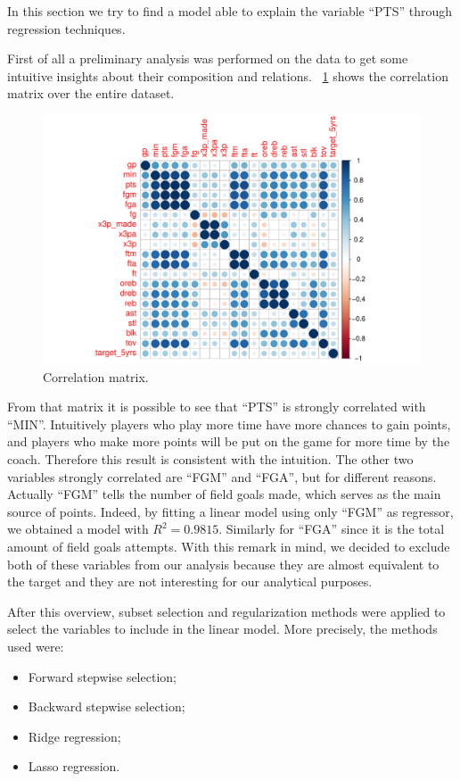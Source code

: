 In this section we try to find a model able to explain the variable ``PTS'' through regression techniques.

First of all a preliminary analysis was performed on the data to get some intuitive insights about their composition and relations.
\Fig~\ref{fig:CorrMatrix} shows the correlation matrix over the entire dataset.
\begin{figure}[H]
	\centering
	\includegraphics[width=0.7\linewidth]{ImageFiles/Regression/CorrMatrix.pdf}
	\caption{Correlation matrix.}
	\label{fig:CorrMatrix}
\end{figure}

From that matrix it is possible to see that ``PTS'' is strongly correlated with ``MIN''. Intuitively players who play more time have more chances to gain points, and players who make more points will be put on the game for more time by the coach. Therefore this result is consistent with the intuition.
The other two variables strongly correlated are ``FGM'' and ``FGA'', but for different reasons. Actually ``FGM'' tells the number of field goals made, which serves as the main source of points. Indeed, by fitting a linear model using only ``FGM'' as regressor, we obtained a model with $R^2 = 0.9815$. Similarly for ``FGA'' since it is the total amount of field goals attempts. With this remark in mind, we decided to exclude both of these variables from our analysis because they are almost equivalent to the target and they are not interesting for our analytical purposes.

After this overview, subset selection and regularization methods were applied to select the variables to include in the linear model. More precisely, the methods used were:
\begin{itemize}
	\item Forward stepwise selection;
	\item Backward stepwise selection;
	\item Ridge regression;
	\item Lasso regression.
\end{itemize}
